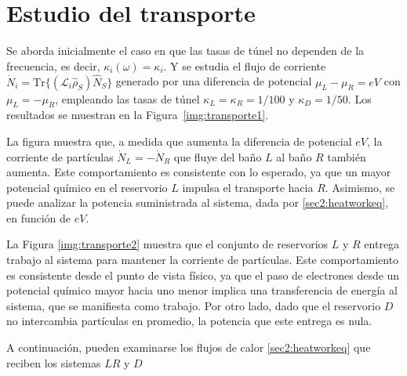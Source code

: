 \label{sec5:modelo}

\newpage

\section{Estudio del transporte}
Se aborda inicialmente el caso en que las tasas de túnel no dependen de la frecuencia, es decir, $\kappa_{i}(\omega) = \kappa_{i}$. Y se estudia el flujo de corriente $\dot{N}_{i} = \text{Tr}\{(\mathcal{L}_{i}\hat{\rho}_{S})\hat{N}_{S}\}$ generado por una diferencia de potencial $\mu_{L} - \mu_{R} = eV$ con $\mu_{L}=-\mu_{R}$, empleando las tasas de túnel $\kappa_{L} = \kappa_{R} = 1/100$ y $\kappa_{D} = 1/50$. Los resultados se muestran en la Figura~\ref{img:transporte1}.


La figura muestra que, a medida que aumenta la diferencia de potencial \( eV \), la corriente de partículas \( \dot{N}_L = -\dot{N}_R \) que fluye del baño \( L \) al baño \( R \) también aumenta. Este comportamiento es consistente con lo esperado, ya que un mayor potencial químico en el reservorio \( L \) impulsa el transporte hacia \( R \). Asimismo, se puede analizar la potencia suministrada al sistema, dada por \ref{sec2:heatworkeq}, en función de \( eV \).

    
La Figura \ref{img:transporte2} muestra que el conjunto de reservorios \( L \) y \( R \) entrega trabajo al sistema para mantener la corriente de partículas. Este comportamiento es consistente desde el punto de vista físico, ya que el paso de electrones desde un potencial químico mayor hacia uno menor implica una transferencia de energía al sistema, que se manifiesta como trabajo. Por otro lado, dado que el reservorio \( D \) no intercambia partículas en promedio, la potencia que este entrega es nula.

 A continuación, pueden examinarse los flujos de calor \ref{sec2:heatworkeq} que reciben los sistemas $LR$ y $D$


